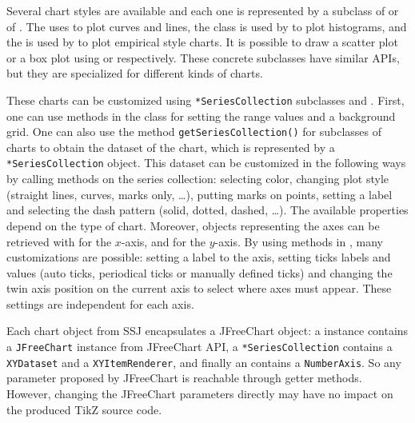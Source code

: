 Several chart styles are available and each one is represented by a
 subclass of  or of
.
The  uses
to plot curves and lines, the
class is used by
 to plot
histograms, and the
 is used by
 to plot empirical style charts. It is possible to draw a scatter plot or a box plot using
 or
 respectively.
These concrete subclasses have similar APIs, but they are specialized for
different kinds of charts.

These charts can be customized using
\texttt{*SeriesCollection} subclasses and
.
First, one can use methods in
the  class for
setting the range values and a background grid.
One can also use the method
\texttt{getSeriesCollection()} for subclasses of charts to obtain
the dataset of the chart, which is represented by a
\texttt{*SeriesCollection} object.
This dataset can be customized in the following ways by calling
methods
on the series collection:
selecting color, changing
plot style (straight lines, curves, marks only, \ldots), putting marks
on points, setting a label and selecting the dash pattern (solid,
dotted, dashed, \ldots). The available properties depend on the type
of chart.
Moreover, objects representing the axes can be retrieved with
for the
$x$-axis, and
for  the $y$-axis.
By using methods in ,
many customizations are possible: setting a label to the axis,
setting ticks labels and values (auto ticks, periodical ticks or
manually defined ticks) and changing the twin axis position on the
current axis to select where axes must appear.
These settings are independent for each axis.

Each chart object from SSJ encapsulates a JFreeChart object: a
 instance contains a
\texttt{JFreeChart} instance from JFreeChart API, a
\texttt{*SeriesCollection} contains a
\texttt{XYDataset} and a \texttt{XYItem\-Renderer}, and finally an
 contains a
\texttt{NumberAxis}. So any parameter proposed by
JFreeChart  is reachable through
getter methods.  However,
changing the JFreeChart parameters directly may have no impact
on the produced TikZ source code.

